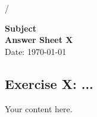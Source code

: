 /\documentclass[11pt]{article}
\begin{document}
\begin{center}
    {\Large \textbf{Subject}} \\ [0.3em]
    {\large \textbf{Answer Sheet X}} \\ [0.3em]
    \large Date: \today
\end{center}

\vspace{1cm}

\subsection*{Exercise X: ...}

Your content here.
\end{document}
